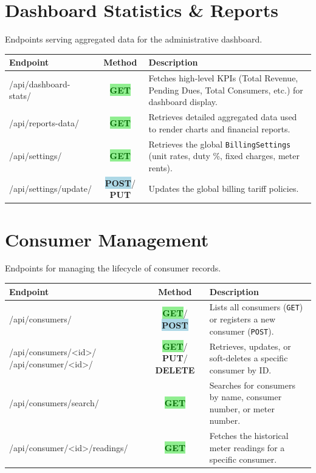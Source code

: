 \documentclass[12pt, a4paper]{report}
\newcommand{\httpget}{\colorbox{lightGreen}{\textcolor{darkGreen}{\textbf{\small GET}}}}
\newcommand{\httppost}{\colorbox{lightBlue}{\textcolor{deepBlue}{\textbf{\small POST}}}}
\newcommand{\httpdelete}{\colorbox{red!10}{\textcolor{red!70!black}{\textbf{\small DELETE}}}}
\newcommand{\httpput}{\colorbox{purple!10}{\textcolor{purple!70!black}{\textbf{\small PUT}}}}
\begin{document}
\section{Dashboard Statistics \& Reports}
Endpoints serving aggregated data for the administrative dashboard.

\begin{table}[H]
\centering
\begin{tabularx}{\textwidth}{>{\ttfamily\raggedright\arraybackslash}p{} c X}
\toprule
\textbf{Endpoint} & \textbf{Method} & \textbf{Description} \\
\midrule
/api/dashboard-stats/ & \httpget & Fetches high-level KPIs (Total Revenue, Pending Dues, Total Consumers, etc.) for dashboard display. \\
/api/reports-data/ & \httpget & Retrieves detailed aggregated data used to render charts and financial reports. \\
/api/settings/ & \httpget & Retrieves the global \texttt{BillingSettings} (unit rates, duty \%, fixed charges, meter rents). \\
/api/settings/update/ & \httppost / \httpput & Updates the global billing tariff policies. \\
\bottomrule
\end{tabularx}
\end{table}

\section{Consumer Management}
Endpoints for managing the lifecycle of consumer records.

\begin{table}[H]
\centering
\begin{tabularx}{\textwidth}{>{\ttfamily\raggedright\arraybackslash}p{} c X}
\toprule
\textbf{Endpoint} & \textbf{Method} & \textbf{Description} \\
\midrule
/api/consumers/ & \httpget / \httppost & Lists all consumers (\texttt{GET}) or registers a new consumer (\texttt{POST}). \\
/api/consumers/<id>/ \newline /api/consumer/<id>/ & \httpget / \httpput / \httpdelete & Retrieves, updates, or soft-deletes a specific consumer by ID. \\
/api/consumers/search/ & \httpget & Searches for consumers by name, consumer number, or meter number. \\
/api/consumer/<id>/readings/ & \httpget & Fetches the historical meter readings for a specific consumer. \\
\bottomrule
\end{tabularx}
\end{table}
\end{document}
